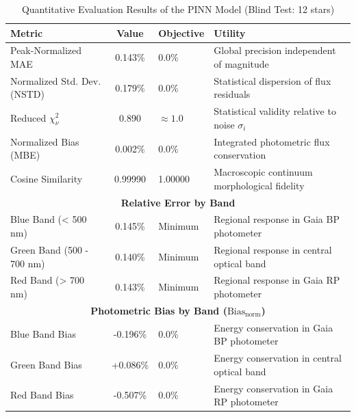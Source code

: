 
\begin{table}[htpb]
\centering
\caption{Quantitative Evaluation Results of the PINN Model (Blind Test: 12 stars)}
\label{tab:pinn_evaluation}
\begin{tabular}{lcll}
\hline
\textbf{Metric} & \textbf{Value} & \textbf{Objective} & \textbf{Utility} \\
\hline
Peak-Normalized MAE & 0.143\% & 0.0\% & Global precision independent of magnitude \\
Normalized Std. Dev. (NSTD) & 0.179\% & 0.0\% & Statistical dispersion of flux residuals \\
Reduced $\chi^2_\nu$ & 0.890 & $\approx 1.0$ & Statistical validity relative to noise $\sigma_i$ \\
Normalized Bias (MBE) & 0.002\% & 0.0\% & Integrated photometric flux conservation \\
Cosine Similarity & 0.99990 & 1.00000 & Macroscopic continuum morphological fidelity \\
\hline
\multicolumn{4}{c}{\textbf{Relative Error by Band}} \\
\hline
Blue Band (< 500 nm) & 0.145\% & Minimum & Regional response in Gaia BP photometer \\
Green Band (500 - 700 nm) & 0.140\% & Minimum & Regional response in central optical band \\
Red Band (> 700 nm) & 0.143\% & Minimum & Regional response in Gaia RP photometer \\
\hline
\multicolumn{4}{c}{\textbf{Photometric Bias by Band ($\text{Bias}_{\text{norm}}$)}} \\
\hline
Blue Band Bias & -0.196\% & 0.0\% & Energy conservation in Gaia BP photometer \\
Green Band Bias & +0.086\% & 0.0\% & Energy conservation in central optical band \\
Red Band Bias & -0.507\% & 0.0\% & Energy conservation in Gaia RP photometer \\
\hline
\end{tabular}
\end{table}
